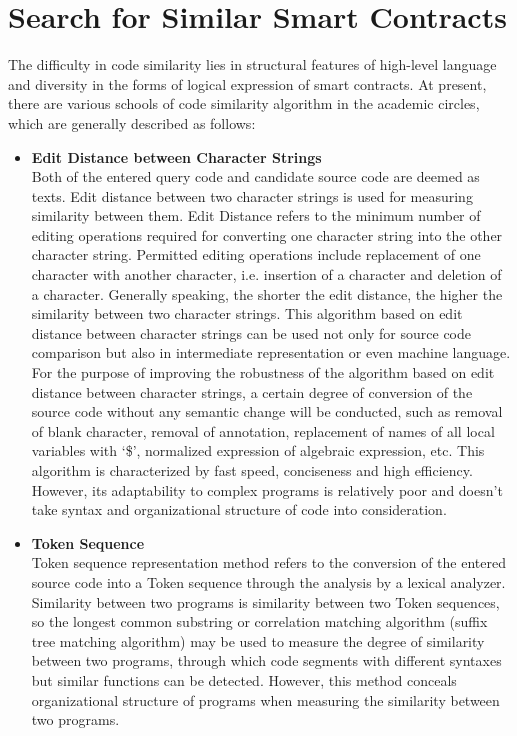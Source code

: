 \section{Search for Similar Smart Contracts}
\label{appendix:sim_code}

The difficulty in code similarity lies in structural features of high-level language and diversity in the forms of logical expression of smart contracts. At present, there are various schools of code similarity algorithm in the academic circles, which are generally described as follows:

\begin{itemize}
	\item \textbf{Edit Distance between Character Strings} \\
	Both of the entered query code and candidate source code are deemed as texts. Edit distance between two character strings is used for measuring similarity between them. Edit Distance refers to the minimum number of editing operations required for converting one character string into the other character string. Permitted editing operations include replacement of one character with another character, i.e. insertion of a character and deletion of a character. Generally speaking, the shorter the edit distance, the higher the similarity between two character strings. This algorithm based on edit distance between character strings can be used not only for source code comparison but also in intermediate representation or even machine language.
	For the purpose of improving the robustness of the algorithm based on edit distance between character strings, a certain degree of conversion of the source code without any semantic change will be conducted, such as removal of blank character, removal of annotation, replacement of names of all local variables with ‘\$’, normalized expression of algebraic expression, etc. This algorithm is characterized by fast speed, conciseness and high efficiency. However, its adaptability to complex programs is relatively poor and doesn't take syntax and organizational structure of code into consideration.


	\item \textbf{Token Sequence} \\
	Token sequence representation method refers to the conversion of the entered source code into a Token sequence through the analysis by a lexical analyzer. Similarity between two programs is similarity between two Token sequences, so the longest common substring or correlation matching algorithm (suffix tree matching algorithm) may be used to measure the degree of similarity between two programs, through which code segments with different syntaxes but similar functions can be detected. However, this method conceals organizational structure of programs when measuring the similarity between two programs.


\end{itemize}
